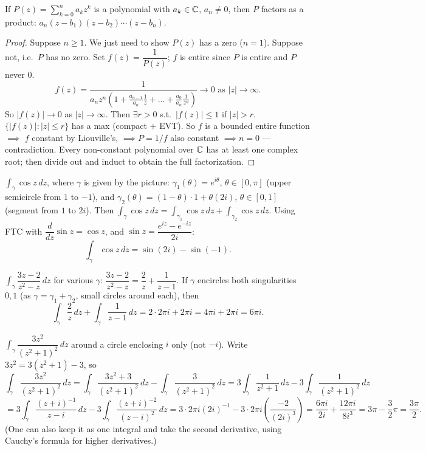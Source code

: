 \documentclass[11pt]{article}
\begin{document}
\begin{theorem}
If $P(z) = \sum_{k=0}^n a_kz^k$ is a polynomial with $a_k\in{\mathbb{C}}$, $a_n\ne0$, then $P$ factors as a product: $a_n(z-b_1)(z-b_2)\cdots(z-b_n)$.
\end{theorem}

\begin{proof}
Suppose $n\ge1$. We just need to show $P(z)$ has a zero ($n=1$).
Suppose not, i.e.\ $P$ has no zero. Set $f(z) = \dfrac{1}{P(z)}$; $f$ is entire since $P$ is entire and $P$ never $0$.
\[
f(z) = \frac{1}{a_nz^n\left(1+\frac{a_{n-1}}{a_n}\frac1z + \dots + \frac{a_0}{a_n}\frac{1}{z^n}\right)} \to 0 \text{ as } |z|\to\infty.
\]
So $|f(z)| \to 0$ as $|z|\to\infty$. Then $\exists r>0$ s.t.\ $|f(z)|\le1$ if $|z|>r$. $\{|f(z)| : |z|\le r\}$ has a max (compact + EVT). So $f$ is a bounded entire function $\implies$ $f$ constant by Liouville's, $\implies P=1/f$ also constant $\implies n=0$ --- contradiction. Every non-constant polynomial over ${\mathbb{C}}$ has at least one complex root; then divide out and induct to obtain the full factorization.
\end{proof}

\begin{example}
$\int_\gamma \cos z\,dz$, where $\gamma$ is given by the picture: $\gamma_1(\theta)=e^{i\theta}$, $\theta\in[0,\pi]$ (upper semicircle from $1$ to $-1$), and $\gamma_2(\theta) = (1-\theta)\cdot1+\theta(2i)$, $\theta\in[0,1]$ (segment from $1$ to $2i$). Then $\int_\gamma \cos z\,dz = \int_{\gamma_1}\cos z\,dz + \int_{\gamma_2}\cos z\,dz$. Using FTC with $\dfrac{d}{dz}\sin z=\cos z$, and $\sin z = \dfrac{e^{iz}-e^{-iz}}{2i}$:
\[
\int_\gamma \cos z\,dz = \sin(2i) - \sin(-1).
\]
\end{example}

\begin{example}
$\int_\gamma \dfrac{3z-2}{z^2-z}\,dz$ for various $\gamma$: $\dfrac{3z-2}{z^2-z} = \dfrac{2}{z}+\dfrac{1}{z-1}$. If $\gamma$ encircles both singularities $0,1$ (as $\gamma = \gamma_1+\gamma_2$, small circles around each), then
\[
\int_\gamma \frac{2}{z}\,dz + \int_\gamma \frac{1}{z-1}\,dz = 2\cdot2\pi i + 2\pi i = 4\pi i + 2\pi i = 6\pi i.
\]
\end{example}

\begin{example}
$\int_\gamma \dfrac{3z^2}{(z^2+1)^2}\,dz$ around a circle enclosing $i$ only (not $-i$). Write $3z^2 = 3(z^2+1) - 3$, so
\[
\int_\gamma \frac{3z^2}{(z^2+1)^2}\,dz = \int_\gamma \frac{3z^2+3}{(z^2+1)^2}\,dz - \int_\gamma \frac{3}{(z^2+1)^2}\,dz = 3\int_\gamma \frac{1}{z^2+1}\,dz - 3\int_\gamma \frac{1}{(z^2+1)^2}\,dz
\]
\[
= 3\int_\gamma \frac{(z+i)^{-1}}{z-i}\,dz - 3\int_\gamma \frac{(z+i)^{-2}}{(z-i)^2}\,dz = 3\cdot 2\pi i (2i)^{-1} - 3\cdot 2\pi i\left(\frac{-2}{(2i)^3}\right) = \frac{6\pi i}{2i} + \frac{12\pi i}{8i^3} = 3\pi - \frac32\pi = \frac{3\pi}{2}.
\]
(One can also keep it as one integral and take the second derivative, using Cauchy's formula for higher derivatives.)
\end{example}
\end{document}
